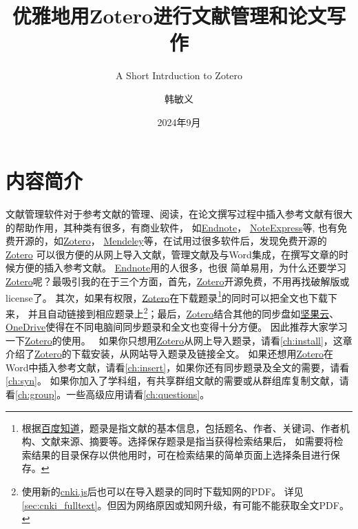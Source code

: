 \documentclass[theorem=false,mathfont=none,openany,sub3section]{easybook}
\title{优雅地用Zotero进行文献管理和论文写作}
\subtitle{A Short Intrduction to Zotero}
\author{韩敏义}
\institute{南京农业大学}
\date{2024年9月}
\begin{document}
\maketitle
\frontmatter
\chapter*{内容简介}

文献管理软件对于参考文献的管理、阅读，在论文撰写过程中插入参考文献有很大的帮助作用，其种类有很多，有商业软件，
如\href{https://endnote.com/}{Endnote}，
\href{http://www.inoteexpress.com/aegean/}{NoteExpress}等,
也有免费开源的，如\href{https://www.zotero.org/}{Zotero}，
\href{https://www.mendeley.com/download-reference-manager/}{Mendeley}等，在试用过很多软件后，发现免费开源的\href{https://www.zotero.org/}{Zotero}
可以很方便的从网上导入文献，管理文献及与Word集成，在撰写文章的时候方便的插入参考文献。
\href{https://endnote.com/}{Endnote}用的人很多，也很
简单易用，为什么还要学习\href{https://www.zotero.org/}{Zotero}呢？最吸引我的在于三个方面，首先，\href{https://www.zotero.org/}{Zotero}开源免费，不用再找破解版或license了。
其次，如果有权限，\href{https://www.zotero.org/}{Zotero}在下载题录\footnote{根据\href{https://zhidao.baidu.com/question/443193991.html}
  {百度知道}，题录是指文献的基本信息，包括题名、作者、关键词、作者机构、文献来源、摘要等。选择保存题录是指当获得检索结果后，
  如需要将检索结果的目录保存以供他用时，可在检索结果的简单页面上选择条目进行保存。}的同时可以把全文也下载下来，
并且自动链接到相应题录上\footnote{使用新的\href{https://github.com/Zotero-CN/translators_CN}{cnki.js}后也可以在导入题录的同时下载知网的PDF。
  详见\cref{sec:cnki_fulltext}。但因为网络原因或知网升级，有可能不能获取全文PDF。}；最后，\href{https://www.zotero.org/}{Zotero}结合其他的同步盘如\href{https://www.jianguoyun.com}{坚果云}、
\href{https://office.live.com/start/OneDrive.aspx}{OneDrive}使得在不同电脑间同步题录和全文也变得十分方便。
因此推荐大家学习一下\href{https://www.zotero.org/}{Zotero}的使用。
\
如果你只想用\href{https://www.zotero.org/}{Zotero}从网上导入题录，请看\cref{ch:install}，这章介绍了\href{https://www.zotero.org/}{Zotero}的下载安装，从网站导入题录及链接全文。
如果还想用\href{https://www.zotero.org/}{Zotero}在Word中插入参考文献，请看\cref{ch:insert}，如果你还有同步题录及全文的需要，请看\cref{ch:syn}。
如果你加入了学科组，有共享群组文献的需要或从群组库复制文献，请看\cref{ch:group}。一些高级应用请看\cref{ch:questions}。
\end{document}
